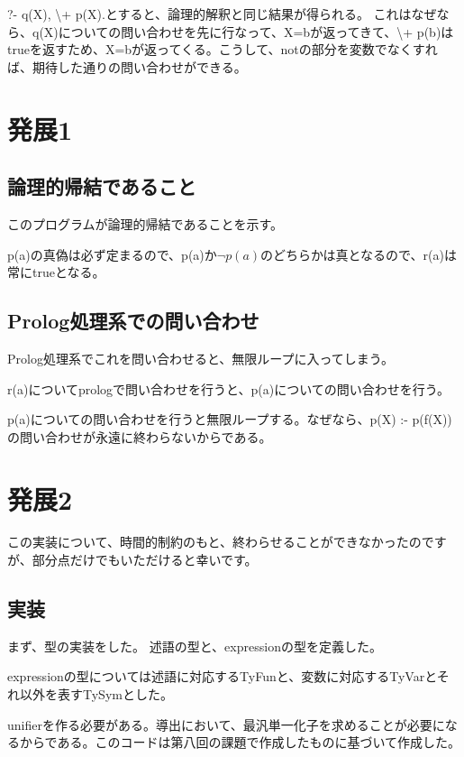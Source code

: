 \documentclass[uplatex,12pt]{jsarticle}
\begin{document}
?- q(X), \backslash + p(X).とすると、論理的解釈と同じ結果が得られる。
これはなぜなら、q(X)についての問い合わせを先に行なって、X=bが返ってきて、\backslash + p(b)はtrueを返すため、X=bが返ってくる。こうして、notの部分を変数でなくすれば、期待した通りの問い合わせができる。


\section{発展1}
\subsection{論理的帰結であること}
このプログラムが論理的帰結であることを示す。

p(a)の真偽は必ず定まるので、p(a)か$\lnot p(a)$のどちらかは真となるので、r(a)は常にtrueとなる。

\subsection{Prolog処理系での問い合わせ}
Prolog処理系でこれを問い合わせると、無限ループに入ってしまう。

r(a)についてprologで問い合わせを行うと、p(a)についての問い合わせを行う。

p(a)についての問い合わせを行うと無限ループする。なぜなら、p(X) :- p(f(X))の問い合わせが永遠に終わらないからである。

\section{発展2}

この実装について、時間的制約のもと、終わらせることができなかったのですが、部分点だけでもいただけると幸いです。

\subsection{実装}
まず、型の実装をした。
述語の型と、expressionの型を定義した。

expressionの型については述語に対応するTyFunと、変数に対応するTyVarとそれ以外を表すTySymとした。

\vspace{12pt}

unifierを作る必要がある。導出において、最汎単一化子を求めることが必要になるからである。このコードは第八回の課題で作成したものに基づいて作成した。

\vspace{12pt}
\end{document}
